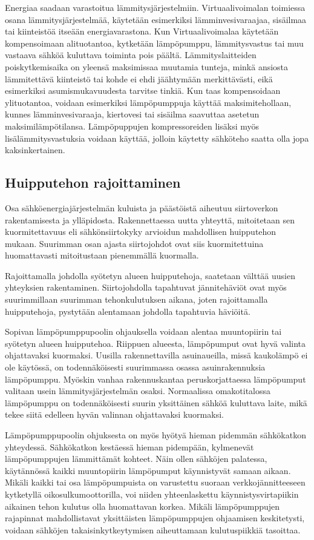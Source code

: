   Energiaa saadaan varastoitua lämmitysjärjestelmiin. Virtuaalivoimalan toimiessa osana lämmitysjärjestelmää, käytetään esimerkiksi lämminvesivaraajaa, sisäilmaa tai kiinteistöä itseään energiavarastona. Kun Virtuaalivoimalaa käytetään kompensoimaan alituotantoa, kytketään lämpöpumppu, lämmitysvastus tai muu vastaava sähköä kuluttava toiminta pois päältä. Lämmityslaitteiden poiskytkemisaika on yleensä maksimissaa muutamia tunteja, minkä ansiosta lämmitettävä kiinteistö tai kohde ei ehdi jäähtymään merkittävästi, eikä esimerkiksi asumismukavuudesta tarvitse tinkiä. Kun taas kompensoidaan ylituotantoa, voidaan esimerkiksi lämpöpumppuja käyttää maksimitehollaan, kunnes lämminvesivaraaja, kiertovesi tai sisäilma saavuttaa asetetun maksimilämpötilansa. Lämpöpuppujen kompressoreiden lisäksi myös lisälämmitysvastuksia voidaan käyttää, jolloin käytetty sähköteho saatta olla jopa kaksinkertainen.

\subsection{Huipputehon rajoittaminen}

  Osa sähköenergiajärjestelmän kuluista ja päästöistä aiheutuu siirtoverkon rakentamisesta ja ylläpidosta. Rakennettaessa uutta yhteyttä, mitoitetaan sen kuormitettavuus eli sähkönsiirtokyky arvioidun mahdollisen huipputehon mukaan. Suurimman osan ajasta siirtojohdot ovat siis kuormitettuina huomattavasti mitoitustaan pienemmällä kuormalla.

  Rajoittamalla johdolla syötetyn alueen huipputehoja, saatetaan välttää uusien yhteyksien rakentaminen. Siirtojohdolla tapahtuvat jännitehäviöt ovat myös suurimmillaan suurimman tehonkulutuksen aikana, joten rajoittamalla huipputehoja, pystytään alentamaan johdolla tapahtuvia häviöitä.

  Sopivan lämpöpumppupoolin ohjauksella voidaan alentaa muuntopiirin tai syötetyn alueen huipputehoa. Riippuen alueesta, lämpöpumput ovat hyvä valinta ohjattavaksi kuormaksi. Uusilla rakennettavilla asuinaueilla, missä kaukolämpö ei ole käytössä, on todennäköisesti suurimmassa osassa asuinrakennuksia lämpöpumppu. Myöskin vanhaa rakennuskantaa peruskorjattaessa lämpöpumput valitaan usein lämmitysjärjestelmän osaksi. Normaalissa omakotitalossa lämpöpumppu on todennäköisesti suurin yksittäinen sähköä kuluttava laite, mikä tekee siitä edelleen hyvän valinnan ohjattavaksi kuormaksi.

  Lämpöpumppupoolin ohjuksesta on myös hyötyä hieman pidemmän sähkökatkon yhteydessä. Sähkökatkon kestäessä hieman pidempään, kylmenevät lämpöpumppujen lämmittämät kohteet. Näin ollen sähköjen palatessa, käytännössä kaikki muuntopiirin lämpöpumput käynnistyvät samaan aikaan. Mikäli kaikki tai osa lämpöpumpuista on varustettu suoraan verkkojännitteeseen kytketyllä oikosulkumoottorilla, voi niiden yhteenlaskettu käynnistysvirtapiikin aikainen tehon kulutus olla huomattavan korkea. Mikäli lämpöpumppujen rajapinnat mahdollistavat yksittäisten lämpöpumppujen ohjaamisen keskitetysti, voidaan sähköjen takaisinkytkeytymisen aiheuttamaan kulutuspiikkiä tasoittaa.

